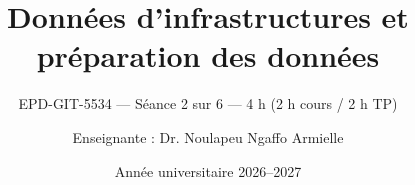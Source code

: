 
\title[EPD-GIT-5534 --- Séance 2]{Données d'infrastructures et préparation des données}
\subtitle{EPD-GIT-5534 --- Séance 2 sur 6 --- 4 h (2 h cours / 2 h TP)}
\author{Enseignante : Dr. Noulapeu Ngaffo Armielle}
\date{Année universitaire 2026--2027}






